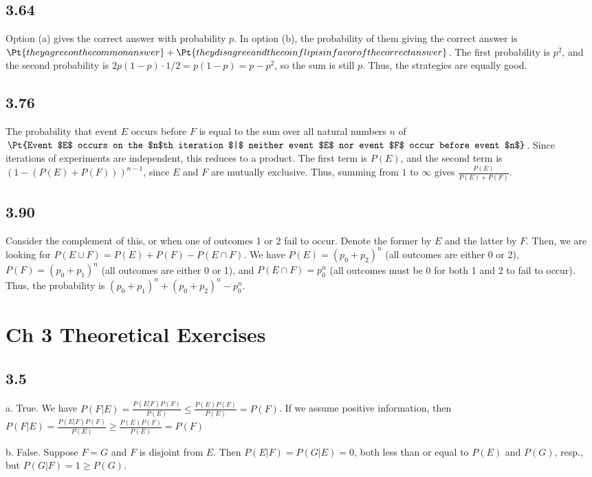 \documentclass{article}
\begin{document}
\subsection*{3.64}
Option (a) gives the correct answer with probability $p$. In option (b), the probability of them giving the correct answer is $\Pt{they agree on the common answer}+\Pt{they disagree and the coin flip is in favor of the correct answer}$. The first probability is $p^2$, and the second probability is $2p(1-p)\cdot1/2=p(1-p)=p-p^2$, so the sum is still $p$. Thus, the strategies are equally good.
\subsection*{3.76}
The probability that event $E$ occurs before $F$ is equal to the sum over all natural numbers $n$ of $\Pt{Event $E$ occurs on the $n$th iteration $|$ neither event $E$ nor event $F$ occur before event $n$}$. Since iterations of experiments are independent, this reduces to a product. The first term is $P(E)$, and the second term is $(1-(P(E)+P(F)))^{n-1}$, since $E$ and $F$ are mutually exclusive. Thus, summing from $1$ to $\infty$ gives $\frac{P(E)}{P(E)+P(F)}$.
\subsection*{3.90}
Consider the complement of this, or when one of outcomes 1 or 2 fail to occur. Denote the former by $E$ and the latter by $F$. Then, we are looking for $P(E\cup F)=P(E)+P(F)-P(E\cap F)$. We have $P(E)=(p_0+p_2)^n$ (all outcomes are either 0 or 2), $P(F)=(p_0+p_1)^n$ (all outcomes are either 0 or 1), and $P(E\cap F)=p_0^n$ (all outcomes must be 0 for both 1 and 2 to fail to occur). Thus, the probability is $(p_0+p_1)^n+(p_0+p_2)^n-p_0^n$.
\section*{Ch 3 Theoretical Exercises}
\subsection*{3.5}
a. True. We have $P(F|E)=\frac{P(E|F)P(F)}{P(E)}\leq\frac{P(E)P(F)}{P(E)}=P(F)$. If we assume positive information, then $P(F|E)=\frac{P(E|F)P(F)}{P(E)}\geq\frac{P(E)P(F)}{P(E)}=P(F)$

b. False. Suppose $F=G$ and $F$ is disjoint from $E$. Then $P(E|F)=P(G|E)=0$, both less than or equal to $P(E)$ and $P(G)$, resp., but $P(G|F)=1\geq P(G)$.
\end{document}
